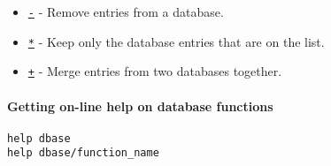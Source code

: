 \begin{itemize}
\itemsep1pt\parskip0pt
\item
  \href{dbase/dbminus}{\texttt{-}} - Remove entries from a database.
\item
  \href{dbase/dbmtimes}{\texttt{*}} - Keep only the database entries
  that are on the list.
\item
  \href{dbase/dbplus}{\texttt{+}} - Merge entries from two databases
  together.
\end{itemize}

\paragraph{Getting on-line help on database
functions}\label{getting-on-line-help-on-database-functions}

\begin{verbatim}
help dbase
help dbase/function_name
\end{verbatim}



